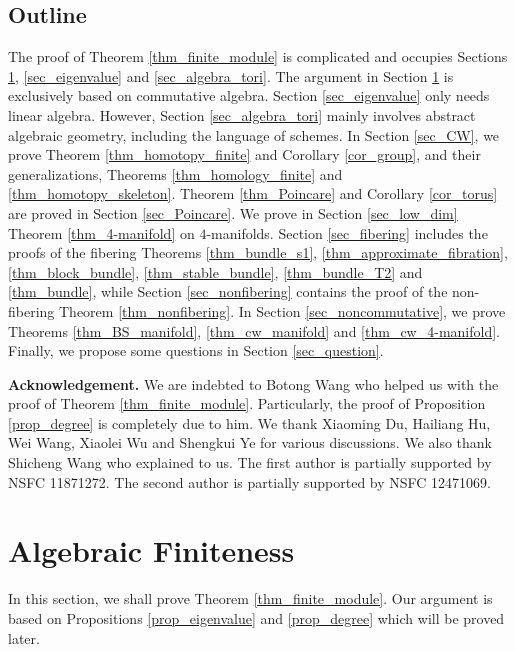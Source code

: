\documentclass[12pt]{amsart}
\theoremstyle{plain}
\theoremstyle{definition}
\theoremstyle{question}
\theoremstyle{remark}
\theoremstyle{assumption}
\numberwithin{equation}{section}
\theoremstyle{bigthm}
\begin{document}
\subsection{Outline}
The proof of Theorem \ref{thm_finite_module} is complicated and occupies Sections \ref{sec_algebra_finite}, \ref{sec_eigenvalue} and \ref{sec_algebra_tori}. The argument in Section \ref{sec_algebra_finite} is exclusively based on commutative algebra. Section \ref{sec_eigenvalue} only needs linear algebra. However, Section \ref{sec_algebra_tori} mainly involves abstract algebraic geometry, including the language of schemes. In Section \ref{sec_CW}, we prove Theorem \ref{thm_homotopy_finite} and Corollary \ref{cor_group}, and their generalizations, Theorems \ref{thm_homology_finite} and \ref{thm_homotopy_skeleton}. Theorem \ref{thm_Poincare} and Corollary \ref{cor_torus} are proved in Section \ref{sec_Poincare}. We prove in Section \ref{sec_low_dim}  Theorem \ref{thm_4-manifold} on $4$-manifolds. Section \ref{sec_fibering} includes the proofs of the fibering Theorems \ref{thm_bundle_s1}, \ref{thm_approximate_fibration}, \ref{thm_block_bundle}, \ref{thm_stable_bundle}, \ref{thm_bundle_T2} and \ref{thm_bundle}, while Section \ref{sec_nonfibering} contains the proof of the non-fibering Theorem \ref{thm_nonfibering}. In Section \ref{sec_noncommutative}, we prove Theorems \ref{thm_BS_manifold}, \ref{thm_cw_manifold} and \ref{thm_cw_4-manifold}. Finally, we propose some questions in Section \ref{sec_question}.

\medskip

\noindent \textbf{Acknowledgement.}
We are indebted to Botong Wang who helped us with the proof of Theorem \ref{thm_finite_module}. Particularly, the proof of Proposition \ref{prop_degree} is completely due to him. We thank Xiaoming Du, Hailiang Hu, Wei Wang, Xiaolei Wu and Shengkui Ye for various discussions. We also thank Shicheng Wang who explained \cite{Wang_Wu} to us. The first author is partially supported by NSFC 11871272. The second author is partially supported by NSFC 12471069.

\section{Algebraic Finiteness}\label{sec_algebra_finite}
In this section, we shall prove Theorem \ref{thm_finite_module}. Our argument is based on Propositions \ref{prop_eigenvalue} and \ref{prop_degree} which will be proved later.
\end{document}
